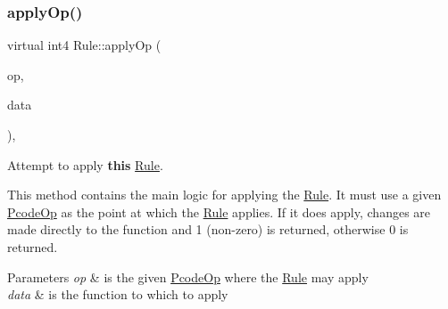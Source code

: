 \subsubsection{\texorpdfstring{applyOp()}{applyOp()}}
{\footnotesize\ttfamily virtual int4 Rule\+::apply\+Op (\begin{DoxyParamCaption}\item[{\mbox{\hyperlink{class_pcode_op}{Pcode\+Op}} $\ast$}]{op,  }\item[{\mbox{\hyperlink{class_funcdata}{Funcdata}} \&}]{data }\end{DoxyParamCaption})\hspace{0.3cm}{\ttfamily [inline]}, {\ttfamily [virtual]}}



Attempt to apply {\bfseries{this}} \mbox{\hyperlink{class_rule}{Rule}}. 

This method contains the main logic for applying the \mbox{\hyperlink{class_rule}{Rule}}. It must use a given \mbox{\hyperlink{class_pcode_op}{Pcode\+Op}} as the point at which the \mbox{\hyperlink{class_rule}{Rule}} applies. If it does apply, changes are made directly to the function and 1 (non-\/zero) is returned, otherwise 0 is returned. 
\begin{DoxyParams}{Parameters}
{\em op} & is the given \mbox{\hyperlink{class_pcode_op}{Pcode\+Op}} where the \mbox{\hyperlink{class_rule}{Rule}} may apply \\
\hline
{\em data} & is the function to which to apply \\
\hline
\end{DoxyParams}


